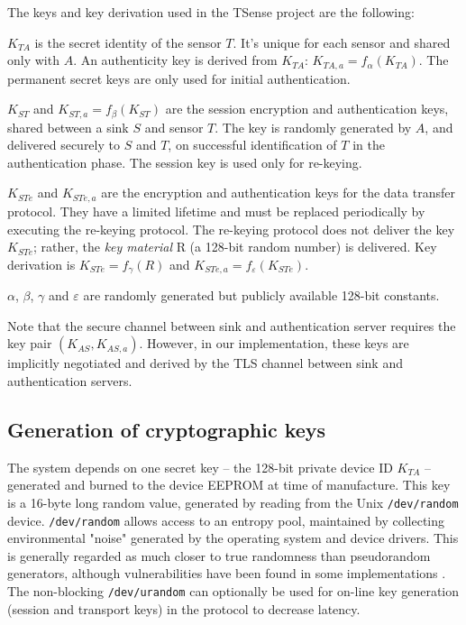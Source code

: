 The keys and key derivation used in the TSense project are the following:
%
\begin{description}

\item $K_{TA}$ is the secret identity of the sensor $T$. It's unique for each sensor and shared only with $A$. An authenticity key is derived from $K_{TA}$: $K_{TA,a} = f_\alpha(K_{TA})$. The permanent secret keys are only used for initial authentication.

\item $K_{ST}$ and $K_{ST,a}=f_\beta(K_{ST})$ are the session encryption and authentication keys, shared between a sink $S$ and sensor $T$. The key is randomly generated by $A$, and delivered securely to $S$ and $T$, on successful identification of $T$ in the authentication phase. The session key is used only for re-keying.

\item $K_{STe}$ and $K_{STe,a}$ are the encryption and authentication keys for the data transfer protocol. They have a limited lifetime and must be replaced periodically by executing the re-keying protocol. The re-keying protocol does not deliver the key $K_{STe}$; rather, the \textit{key material} R (a 128-bit random number) is delivered. Key derivation is $K_{STe} = f_\gamma(R)$ and $K_{STe,a} = f_\varepsilon(K_{STe})$. 
\end{description}
%
$\alpha$, $\beta$, $\gamma$ and $\varepsilon$ are randomly generated but publicly available 128-bit constants.

Note that the secure channel between sink and authentication server requires the key pair $(K_{AS},K_{AS,a})$. However, in our implementation, these keys are implicitly negotiated and derived by the TLS channel between sink and authentication servers.

\subsection{Generation of cryptographic keys}

The system depends on one secret key -- the 128-bit private device ID $K_{TA}$ -- generated and burned to the device EEPROM at time of manufacture. This key is a 16-byte long random value, generated by reading from the Unix \texttt{/dev/random} device. \texttt{/dev/random} allows access to an entropy pool, maintained by collecting environmental "noise" generated by the operating system and device drivers. This is generally regarded as much closer to true randomness than pseudorandom generators, although vulnerabilities have been found in some implementations . The non-blocking \texttt{/dev/urandom} can optionally be used for on-line key generation (session and transport keys) in the protocol to decrease latency.

